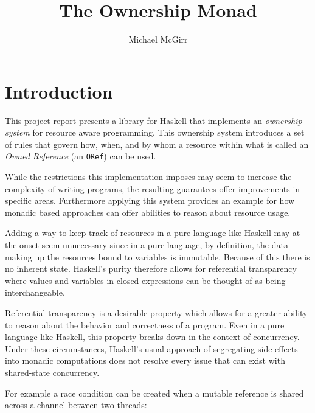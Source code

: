 \documentclass[onehalf,11pt]{beavtex}
\title{The Ownership Monad}
\author{Michael McGirr}
\begin{document}
\maketitle

\mainmatter

\chapter{Introduction}

This project report presents a library for Haskell that implements an
\textit{ownership system} for resource aware programming. This ownership system
introduces a set of rules that govern how, when, and by whom a resource within
what is called an \textit{Owned Reference} (an \texttt{ORef}) can be used.

While the restrictions this implementation imposes may seem to increase the
complexity of writing programs, the resulting guarantees offer improvements in
specific areas.
Furthermore applying this system provides an example for how monadic based
approaches can offer abilities to reason about resource usage.

Adding a way to keep track of resources in a pure language like Haskell may
at the onset seem unnecessary since in a pure language, by definition,
the data making up the resources bound to variables is immutable.
Because of this there is no inherent state.  Haskell's purity therefore allows
for referential transparency where values and variables in closed expressions
can be thought of as being interchangeable.

Referential transparency is a desirable property which allows for a greater
ability to reason about the behavior and correctness of a program.
Even in a pure language like Haskell, this property breaks down in the context
of concurrency.
Under these circumstances, Haskell's usual approach of segregating side-effects
into monadic computations does not resolve every issue that can exist with
shared-state concurrency.

For example a race condition can be created when a mutable reference is shared
across a channel between two threads:
\end{document}
